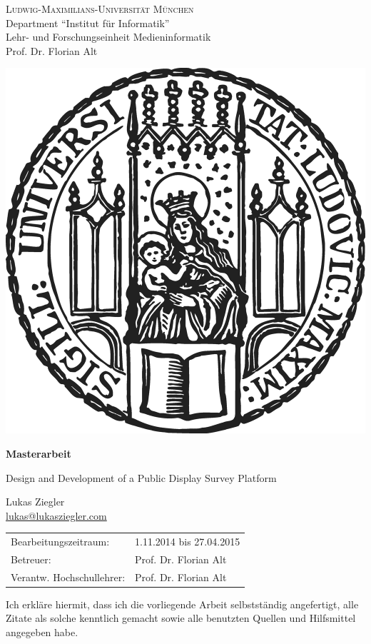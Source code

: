 \documentclass[11pt,a4paper,twoside]{article}
\begin{document}
\pagestyle{empty} %

\begin{center}
\textsc{Ludwig-Maximilians-Universit\"at M\"unchen}\\
Department ``Institut f\"ur Informatik''\\
Lehr- und Forschungseinheit Medieninformatik\\
Prof. Dr. Florian Alt

\vspace{1.50cm}
\includegraphics[width=.285\columnwidth]{img/lmu-sigillum.png}
\vspace{1.25cm}

{\large\textbf{Masterarbeit}}\vspace{.5cm}

\vspace{2cm}
{\huge Design and Development of a Public Display Survey Platform}
\vspace{2cm}

{\large Lukas Ziegler}\\\href{mailto:lukas@lukasziegler.com}{lukas@lukasziegler.com}

\end{center}
\vfill

\begin{tabular}{ll}
Bearbeitungszeitraum: & 1.11.2014 bis 27.04.2015\\
Betreuer: & Prof. Dr. Florian Alt \\
Verantw. Hochschullehrer: & Prof. Dr. Florian Alt
\end{tabular}

\cleardoublepage

    

\cleardoublepage

    

    \vfill %

    \noindent Ich erkl\"are hiermit, dass ich die vorliegende Arbeit
    selbstst\"andig angefertigt, alle Zitate als solche kenntlich gemacht
    sowie alle benutzten Quellen und Hilfsmittel angegeben habe.
\end{document}
